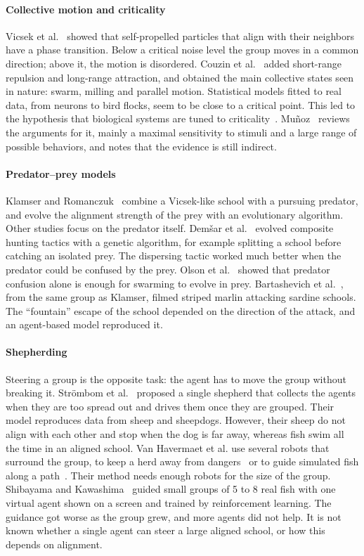 \documentclass[9pt,twoside]{pnas-new}
\begin{document}
\paragraph*{Collective motion and criticality}
Vicsek et al.~\cite{vicsek1995} showed that self-propelled particles that align with their neighbors
have a phase transition. Below a critical noise level the group moves in a common direction; above
it, the motion is disordered. Couzin et al.~\cite{couzin2002} added short-range repulsion and
long-range attraction, and obtained the main collective states seen in nature: swarm, milling and
parallel motion. Statistical models fitted to real data, from neurons to bird flocks, seem to be close
to a critical point. This led to the hypothesis that biological systems are tuned to
criticality~\cite{mora2011}. Mu\~noz~\cite{munoz2018} reviews the arguments for it, mainly a maximal
sensitivity to stimuli and a large range of possible behaviors, and notes that the evidence is still
indirect.

\paragraph*{Predator--prey models}
Klamser and Romanczuk~\cite{klamser2021} combine a Vicsek-like school with a pursuing predator, and
evolve the alignment strength of the prey with an evolutionary algorithm. Other studies focus on the predator itself. Dem\v{s}ar et al.~\cite{demsar2015}
evolved composite hunting tactics with a genetic algorithm, for example splitting a school before
catching an isolated prey. The dispersing tactic worked much better when the predator could be confused by the prey.
Olson et al.~\cite{olson2013} showed that predator confusion alone is enough for swarming to evolve in
prey. Bartashevich et al.~\cite{bartashevich2024}, from the same group as Klamser, filmed striped
marlin attacking sardine schools. The ``fountain'' escape of the school depended on the direction of
the attack, and an agent-based model reproduced it.

\paragraph*{Shepherding}
Steering a group is the opposite task: the agent has to move the group without breaking it.
Str\"ombom et al.~\cite{strombom2014} proposed a single shepherd that collects the agents when they
are too spread out and drives them once they are grouped. Their model reproduces data from sheep and
sheepdogs. However, their sheep do not align with each other and stop when the dog is far away,
whereas fish swim all the time in an aligned school. Van Havermaet et
al. use several robots that surround the group, to keep a herd away from dangers~\cite{vanhavermaet2023}
or to guide simulated fish along a path~\cite{vanhavermaet2024}. Their method needs enough robots for the size of the group. Shibayama and Kawashima~\cite{shibayama2026}
guided small groups of 5 to 8 real fish with one virtual agent shown on a screen and trained by reinforcement learning. The guidance got
worse as the group grew, and more agents did not help. It is not known whether a single agent can steer a large
aligned school, or how this depends on alignment.
\end{document}
